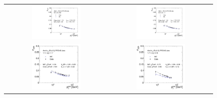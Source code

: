 \begin{description}
\begin{figure}[!htp]
  \centering
  \begin{tabular}{cc}
                \includegraphics[width=0.49\textwidth]{figures/Pythia_NSCFit_Eta0_kNS_kC.pdf} &
                \includegraphics[width=0.49\textwidth]{figures/Pythia_NSCFit_Eta1_kNS_kC.pdf}\\
                \includegraphics[width=0.49\textwidth]{figures/Pythia_NSCFit_Eta2_kNS_kC.pdf} &
                \includegraphics[width=0.49\textwidth]{figures/Pythia_NSCFit_Eta3_kNS_kC.pdf} \\

\end{tabular}
\end{figure}
\end{description}
